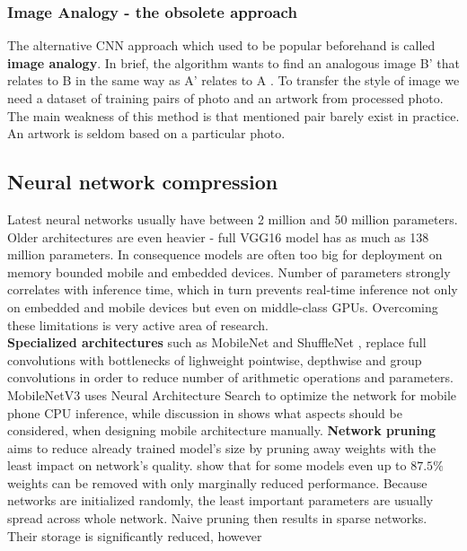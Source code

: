 \documentclass[../Main.tex]{subfiles}
\begin{document}
    
    \subsubsection{Image Analogy - the obsolete approach}
    The alternative CNN approach which used to be popular beforehand is called \textbf{image analogy}. In brief, the algorithm wants to find an analogous image B' that relates to B in the same way as A' relates to A \cite{imageanalogy}. To transfer the style of image we need a dataset of training pairs of photo and an artwork from processed photo. The main weakness of this method is that mentioned pair barely exist in practice. An artwork is seldom based on a particular photo.


\subsection{Neural network compression}
    Latest neural networks usually have between 2 million and 50 million parameters.
    Older architectures are even heavier - full VGG16 model has as much as
    138 million parameters. In consequence models 
    are often too big for deployment on memory bounded mobile and embedded devices.
    Number of parameters strongly correlates with inference time, which in turn
    prevents real-time inference not only on embedded and mobile
    devices but even on middle-class GPUs. Overcoming these limitations 
    is very active area of research.\\
    \textbf{Specialized architectures} such as MobileNet \cite{mobilenetv1, 
    mobilenetv2, mobilenetv3} and ShuffleNet \cite{shufflenetv1,
    shufflenetv2}, replace full convolutions with bottlenecks of lighweight
    pointwise, depthwise and group convolutions in order to reduce number of 
    arithmetic operations and parameters. MobileNetV3 \cite{mobilenetv3} uses
    Neural Architecture Search to optimize the network for mobile phone CPU
    inference, while discussion in \cite{shufflenetv2} shows what aspects should
    be considered, when designing mobile architecture manually. 
    \textbf{Network pruning} aims to reduce already trained model's size by pruning away
    weights with the least impact on network's quality. \cite{zhu2017prune} show
    that for some models even up to $87.5\%$ weights can be removed with only 
    marginally reduced performance. 
    Because networks are initialized randomly, the least
    important parameters are usually spread across whole network. Naive pruning 
    then results in sparse networks. Their storage is significantly reduced, however
\end{document}
